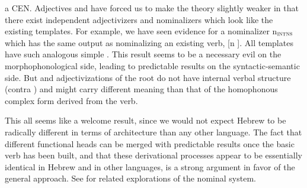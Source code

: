 \begin{exe}
\begin{xlist}
\begin{exe}
\begin{xlist}
\begin{exe}
\begin{exe}
\begin{xlist}
\begin{exe}
\begin{exe}
\begin{xlist}
\begin{exe}
\begin{xlist}
\begin{exe}
\begin{xlist}
\begin{exe}
\begin{xlist}
\begin{xlist}
\begin{exe}
\begin{xlist}
\begin{exe}
\begin{xlist}
\begin{exe}
\begin{exe}
\begin{exe}
\begin{xlist}
\begin{exe}
\begin{exe}
\begin{xlist}
\begin{exe}
\begin{xlist}
\begin{exe}
\begin{xlist}
\begin{exe}
\begin{xlist}
\begin{xlist}
\begin{exe}
\begin{xlist}
\begin{exe}
\begin{xlist}
\begin{exe}
\begin{xlist}
\begin{exe}
\begin{xlist}
\begin{exe}
\begin{exe}
\begin{exe}
\begin{exe}
\begin{exe}
\begin{xlist}
\begin{xlist}
\begin{exe}
\begin{xlist}
\begin{exe}
\begin{xlist}
\begin{exe}
\begin{exe}
\begin{exe}
\begin{xlist}
\begin{exe}
\begin{xlist}
\begin{exe}
\begin{xlist}
\begin{exe}
\begin{exe}
\begin{xlist}
\begin{exe}
\begin{exe}
\begin{exe}
\begin{xlist}
\begin{xlist}
\begin{exe}
\begin{exe}
\begin{exe}
\begin{xlist}
\begin{exe}
\begin{xlist}
a CEN. Adjectives and  have forced us to make the theory slightly weaker in that there exist independent adjectivizers and nominalizers which look like the existing templates. For example, we have seen evidence for a nominalizer n$_{\gsc{INTNS}}$ which has the same output as nominalizing an existing verb, [n \tpie]. All templates have such analogous simple . This result seems to be a necessary evil on the morphophonological side, leading to predictable results on the syntactic-semantic side. But  and adjectivizations of the root do not have internal verbal structure (contra \citealt{borer13oup,borer14lingua}) and might carry different meaning than that of the homophonous complex form derived from the verb.

This all seems like a welcome result, since we would not expect Hebrew to be radically different in terms of architecture than any other language. The fact that different functional heads can be merged with predictable results once the basic verb has been built, and that these derivational processes appear to be essentially identical in Hebrew and in other languages, is a strong argument in favor of the general approach. See \cite{ahdout19phd} for related explorations of the nominal system.\label{r1:5:7}


\end{xlist}
\end{exe}
\end{xlist}
\end{exe}
\end{exe}
\end{exe}
\end{xlist}
\end{xlist}
\end{exe}
\end{exe}
\end{exe}
\end{xlist}
\end{exe}
\end{exe}
\end{xlist}
\end{exe}
\end{xlist}
\end{exe}
\end{xlist}
\end{exe}
\end{exe}
\end{exe}
\end{xlist}
\end{exe}
\end{xlist}
\end{exe}
\end{xlist}
\end{xlist}
\end{exe}
\end{exe}
\end{exe}
\end{exe}
\end{exe}
\end{xlist}
\end{exe}
\end{xlist}
\end{exe}
\end{xlist}
\end{exe}
\end{xlist}
\end{exe}
\end{xlist}
\end{xlist}
\end{exe}
\end{xlist}
\end{exe}
\end{xlist}
\end{exe}
\end{xlist}
\end{exe}
\end{exe}
\end{xlist}
\end{exe}
\end{exe}
\end{exe}
\end{xlist}
\end{exe}
\end{xlist}
\end{exe}
\end{xlist}
\end{xlist}
\end{exe}
\end{xlist}
\end{exe}
\end{xlist}
\end{exe}
\end{xlist}
\end{exe}
\end{exe}
\end{xlist}
\end{exe}
\end{exe}
\end{xlist}
\end{exe}
\end{xlist}
\end{exe}

